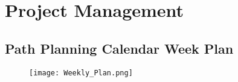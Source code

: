 \section{Project Management}



\subsection{Path Planning Calendar Week Plan}
\begin{figure}[H]
    \centering
    \texttt{[image: Weekly\_Plan.png]}
    \label{fig:Weekly Plan}
\end{figure}

